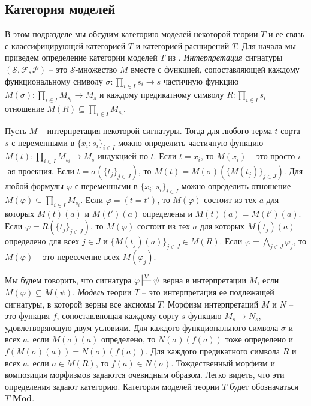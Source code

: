 \documentclass[reqno]{amsart}
\theoremstyle{definition}
\theoremstyle{remark}
\newcommand{\bcat}[1]{\mathbf{#1}}
\newcommand{\Mod}[1]{#1\text{-}\bcat{Mod}}
\begin{document}
\subsection{Категория моделей}
\label{sec:models}

В этом подразделе мы обсудим категорию моделей некоторой теории $T$ и ее связь с классифицирующей категорией $T$ и категорией расширений $T$.
Для начала мы приведем определение категории моделей $T$ из \cite{PHL}.
\emph{Интерпретация} сигнатуры $(\mathcal{S},\mathcal{F},\mathcal{P})$ -- это $\mathcal{S}$-множество $M$ вместе с функцией,
сопоставляющей каждому функциональному символу $\sigma : \prod_{i \in I} s_i \to s$ частичную функцию $M(\sigma) : \prod_{i \in I} M_{s_i} \to M_s$
и каждому предикатному символу $R : \prod_{i \in I} s_i$ отношение $M(R) \subseteq \prod_{i \in I} M_{s_i}$.

Пусть $M$ -- интерпретация некоторой сигнатуры.
Тогда для любого терма $t$ сорта $s$ с переменными в $\{ x_i : s_i \}_{i \in I}$ можно определить частичную функцию $M(t) : \prod_{i \in I} M_{s_i} \to M_s$ индукцией по $t$.
Если $t = x_i$, то $M(x_i)$ -- это просто $i$-ая проекция.
Если $t = \sigma(\{ t_j \}_{j \in J})$, то $M(t) = M(\sigma)(\{ M(t_j) \}_{j \in J})$.
Для любой формулы $\varphi$ с переменными в $\{ x_i : s_i \}_{i \in I}$ можно определить отношение $M(\varphi) \subseteq \prod_{i \in I} M_{s_i}$.
Если $\varphi = (t = t')$, то $M(\varphi)$ состоит из тех $a$ для которых $M(t)(a)$ и $M(t')(a)$ определены и $M(t)(a) = M(t')(a)$.
Если $\varphi = R(\{ t_j \}_{j \in J})$, то $M(\varphi)$ состоит из тех $a$ для которых $M(t_j)(a)$ определено для всех $j \in J$ и $\{ M(t_j)(a) \}_{j \in J} \in M(R)$.
Если $\varphi = \bigwedge_{j \in J} \varphi_j$, то $M(\varphi)$ -- это пересечение всех $M(\varphi_j)$.

Мы будем говорить, что сигнатура $\varphi \sststile{}{V} \psi$ верна в интерпретации $M$, если $M(\varphi) \subseteq M(\psi)$.
\emph{Модель} теории $T$ -- это интерпретация ее подлежащей сигнатуры, в которой верны все аксиомы $T$.
Морфизм интерпретаций $M$ и $N$ -- это функция $f$, сопоставляющая каждому сорту $s$ функцию $M_s \to N_s$, удовлетворяющую двум условиям.
Для каждого функционального символа $\sigma$ и всех $a$, если $M(\sigma)(a)$ определено, то $N(\sigma)(f(a))$ тоже определено и $f(M(\sigma)(a)) = N(\sigma)(f(a))$.
Для каждого предикатного символа $R$ и всех $a$, если $a \in M(R)$, то $f(a) \in N(\sigma)$.
Тождественный морфизм и композиция морфизмов задаются очевидным образом.
Легко видеть, что эти определения задают категорию.
Категория моделей теории $T$ будет обозначаться $\Mod{T}$.
\end{document}
